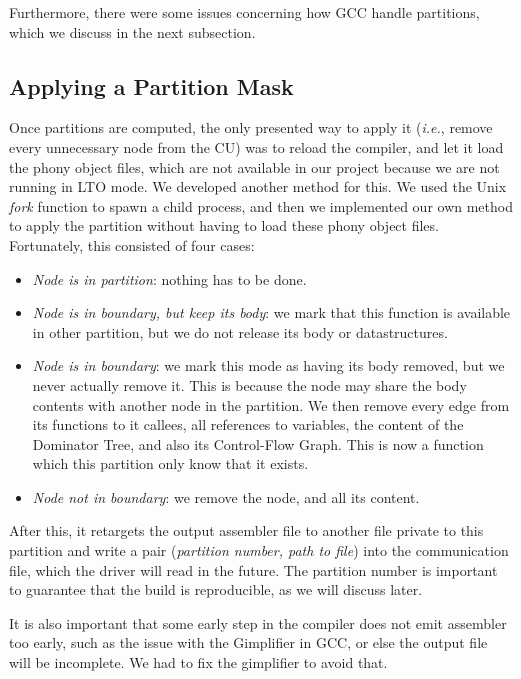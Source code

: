 \documentclass[runningheads]{llncs}
\begin{document}
Furthermore, there were some issues concerning how GCC handle
partitions, which we discuss in the next subsection.

\subsection{Applying a Partition Mask}\label{sec:partition_mask}

Once partitions are computed, the only presented way to apply it (\textit{i.e.},
remove every unnecessary node from the CU) was to reload the
compiler, and let it load the phony object files, which are not available in our
project because we are not running in LTO mode. We developed another method for this.
We used the Unix \textit{fork} function to spawn a child process, and then
we implemented our own method to apply the partition without having to load
these phony object files. Fortunately, this consisted
of four cases:
\begin{itemize}
	\item \textit{Node is in partition}: nothing has to be done.
	\item \textit{Node is in boundary, but keep its body}: we mark that this function
	is available in other partition, but we do not release its body or
	datastructures.
	\item \textit{Node is in boundary}: we mark this mode as having its body removed,
	but we never actually remove it. This is because the node may share the
	body contents with another node in the partition. We then remove
	every edge from its functions to it callees, all references to variables,
	the content of the Dominator Tree, and also its Control-Flow Graph. This
	is now a function which this partition only know that it exists.
	\item \textit{Node not in boundary}: we remove the node, and all its content.
\end{itemize}

After this, it retargets the output assembler file to another file private to
this partition and write a pair (\textit{partition number, path to file}) into the
communication file, which the driver will read in the future. The partition
number is important to guarantee that the build is reproducible, as we will
discuss later.

It is also important that some early step in the compiler does not emit assembler
too early, such as the issue with the Gimplifier in GCC, or else the output
file will be incomplete. We had to fix the gimplifier to avoid that.
\end{document}
